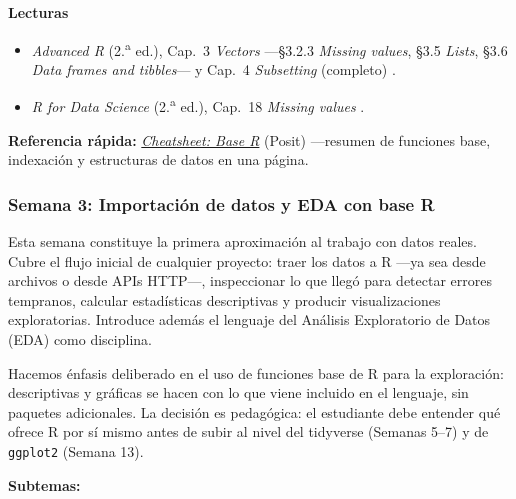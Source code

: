 \documentclass[11pt,letterpaper]{article}
\newcommand{\blue}[1]{{\color{cerulean}#1}}
\newcommand{\orange}[1]{{\color{redorange}#1}}
\newcommand{\semana}[2]{%
  \subsubsection*{\color{main}Semana #1: #2}%
}
\newcommand{\cheatsheet}[2]{%
  \href{https://rstudio.github.io/cheatsheets/#1.pdf}{\textit{Cheatsheet: #2}}%
}
\begin{document}
\medskip
\noindent\textbf{Lecturas}
\begin{itemize}[leftmargin=*, itemsep=1pt]
    \item \textit{Advanced R} (2.\textsuperscript{a} ed.), Cap.\ 3 \textit{Vectors} ---§3.2.3 \textit{Missing values}, §3.5 \textit{Lists}, §3.6 \textit{Data frames and tibbles}--- y Cap.\ 4 \textit{Subsetting} (completo) \cite{wickham2019advr}.
    \item \textit{R for Data Science} (2.\textsuperscript{a} ed.), Cap.\ 18 \textit{Missing values} \cite{wickham2023r4ds}.
\end{itemize}

\medskip
\noindent\textbf{Referencia rápida:} \cheatsheet{base-r}{Base R} (Posit) ---resumen de funciones base, indexación y estructuras de datos en una página.

\semana{3}{Importación de datos y EDA con base R}

Esta semana constituye la primera aproximación al trabajo con datos reales. Cubre el flujo inicial de cualquier proyecto: traer los datos a R ---ya sea desde archivos o desde APIs HTTP---, inspeccionar lo que llegó para detectar errores tempranos, calcular estadísticas descriptivas y producir visualizaciones exploratorias. Introduce además el lenguaje del \blue{Análisis Exploratorio de Datos} (EDA) como disciplina.

Hacemos énfasis deliberado en el uso de \orange{funciones base de R} para la exploración: descriptivas y gráficas se hacen con lo que viene incluido en el lenguaje, sin paquetes adicionales. La decisión es pedagógica: el estudiante debe entender qué ofrece R por sí mismo antes de subir al nivel del tidyverse (Semanas 5--7) y de \texttt{ggplot2} (Semana 13).

\textbf{Subtemas:}
\end{document}
